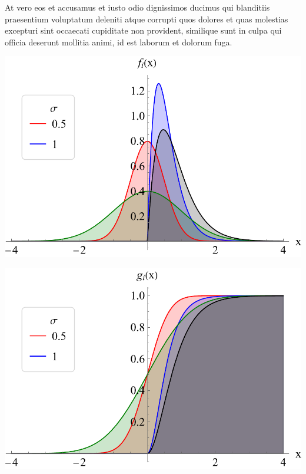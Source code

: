 \documentclass[a0,portrait]{a0poster}
\begin{document}
\begin{mdframed}[style=MyFrame]
\begin{multicols}{2}
At vero eos et accusamus et iusto odio dignissimos ducimus qui blanditiis praesentium voluptatum deleniti atque corrupti quos dolores et quas molestias excepturi sint occaecati cupiditate non provident, similique sunt in culpa qui officia deserunt mollitia animi, id est laborum et dolorum fuga.
%
\vspace{1cm}
\begin{minipage}{\columnwidth}
    \includegraphics[width=0.9\columnwidth]{f}
\end{minipage}
\vspace{1cm} %

\begin{minipage}{\columnwidth}
    \includegraphics[width=0.9\columnwidth]{g}
\end{minipage}


\end{multicols}
\end{mdframed}
\end{document}
